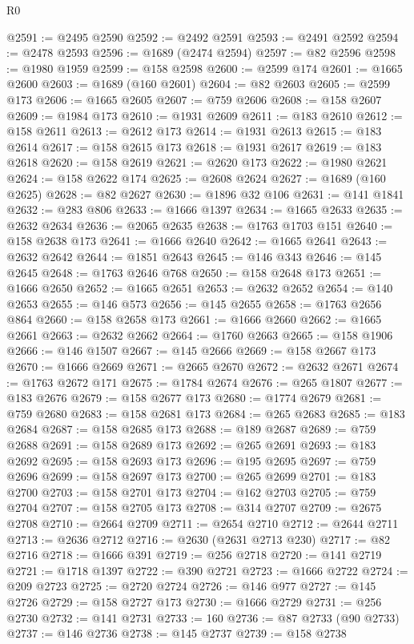 \begin{lexlean}{R0}
\begin{coremodule}
@2591 := @2495 @2590
@2592 := @2492 @2591
@2593 := @2491 @2592
@2594 := @2478 @2593
@2596 := @1689 (@2474 @2594)
@2597 := @82 @2596
@2598 := @1980 @1959
@2599 := @158 @2598
@2600 := @2599 @174
@2601 := @1665 @2600
@2603 := @1689 (@160 @2601)
@2604 := @82 @2603
@2605 := @2599 @173
@2606 := @1665 @2605
@2607 := @759 @2606
@2608 := @158 @2607
@2609 := @1984 @173
@2610 := @1931 @2609
@2611 := @183 @2610
@2612 := @158 @2611
@2613 := @2612 @173
@2614 := @1931 @2613
@2615 := @183 @2614
@2617 := @158 @2615 @173
@2618 := @1931 @2617
@2619 := @183 @2618
@2620 := @158 @2619
@2621 := @2620 @173
@2622 := @1980 @2621
@2624 := @158 @2622 @174
@2625 := @2608 @2624
@2627 := @1689 (@160 @2625)
@2628 := @82 @2627
@2630 := @1896 @32 @106
@2631 := @141 @1841
@2632 := @283 @806
@2633 := @1666 @1397
@2634 := @1665 @2633
@2635 := @2632 @2634
@2636 := @2065 @2635
@2638 := @1763 @1703 @151
@2640 := @158 @2638 @173
@2641 := @1666 @2640
@2642 := @1665 @2641
@2643 := @2632 @2642
@2644 := @1851 @2643
@2645 := @146 @343
@2646 := @145 @2645
@2648 := @1763 @2646 @768
@2650 := @158 @2648 @173
@2651 := @1666 @2650
@2652 := @1665 @2651
@2653 := @2632 @2652
@2654 := @140 @2653
@2655 := @146 @573
@2656 := @145 @2655
@2658 := @1763 @2656 @864
@2660 := @158 @2658 @173
@2661 := @1666 @2660
@2662 := @1665 @2661
@2663 := @2632 @2662
@2664 := @1760 @2663
@2665 := @158 @1906
@2666 := @146 @1507
@2667 := @145 @2666
@2669 := @158 @2667 @173
@2670 := @1666 @2669
@2671 := @2665 @2670
@2672 := @2632 @2671
@2674 := @1763 @2672 @171
@2675 := @1784 @2674
@2676 := @265 @1807
@2677 := @183 @2676
@2679 := @158 @2677 @173
@2680 := @1774 @2679
@2681 := @759 @2680
@2683 := @158 @2681 @173
@2684 := @265 @2683
@2685 := @183 @2684
@2687 := @158 @2685 @173
@2688 := @189 @2687
@2689 := @759 @2688
@2691 := @158 @2689 @173
@2692 := @265 @2691
@2693 := @183 @2692
@2695 := @158 @2693 @173
@2696 := @195 @2695
@2697 := @759 @2696
@2699 := @158 @2697 @173
@2700 := @265 @2699
@2701 := @183 @2700
@2703 := @158 @2701 @173
@2704 := @162 @2703
@2705 := @759 @2704
@2707 := @158 @2705 @173
@2708 := @314 @2707
@2709 := @2675 @2708
@2710 := @2664 @2709
@2711 := @2654 @2710
@2712 := @2644 @2711
@2713 := @2636 @2712
@2716 := @2630 (@2631 @2713 @230)
@2717 := @82 @2716
@2718 := @1666 @391
@2719 := @256 @2718
@2720 := @141 @2719
@2721 := @1718 @1397
@2722 := @390 @2721
@2723 := @1666 @2722
@2724 := @209 @2723
@2725 := @2720 @2724
@2726 := @146 @977
@2727 := @145 @2726
@2729 := @158 @2727 @173
@2730 := @1666 @2729
@2731 := @256 @2730
@2732 := @141 @2731
@2733 := 160
@2736 := @87 @2733 (@90 @2733)
@2737 := @146 @2736
@2738 := @145 @2737
@2739 := @158 @2738

\end{coremodule}
\end{lexlean}
